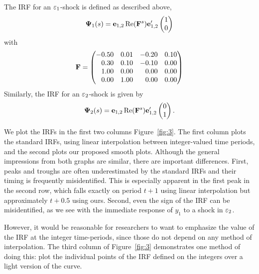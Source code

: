 \documentclass[AER,reviewmode]{tex/AEA}
\begin{document}
The IRF for an $\varepsilon_1$-shock is defined as described above,
\begin{equation*}
  \Psiv_1(s) = \emat_{1,2} \Re(\Fm^s) \emat_{1,2}'
  \begin{pmatrix*}[l]
    1 \\ 0
  \end{pmatrix*}
\end{equation*}
with
\begin{equation*}
\Fm = \begin{pmatrix*}[r]
    - 0.50 & 0.01 & -0.20 & 0.10 \\
      0.30 & 0.10 & -0.10 & 0.00 \\
      1.00 & 0.00 & 0.00 & 0.00 \\
      0.00 & 1.00 & 0.00 & 0.00
  \end{pmatrix*}
\end{equation*}
Similarly, the IRF for an $\varepsilon_2$-shock is given by
\begin{equation*}
  \Psiv_2(s) = \emat_{1,2} \Re(\Fm^s) \emat_{1,2}'
  \begin{pmatrix*}[l]
    0 \\ 1
  \end{pmatrix*}.
\end{equation*}

We plot the IRFs in the first two columns Figure~\ref{fig:3}. The
first column plots the standard IRFs, using linear interpolation
between integer-valued time periods, and the second plots our proposed
smooth plots. Although the general impressions from both graphs are
similar, there are important differences. First, peaks and troughs are
often underestimated by the standard IRFs and their timing is
frequently misidentified. This is especially apparent in the first
peak in the second row, which falls exactly on period $t+1$ using
linear interpolation but approximately $t+0.5$ using ours.  Second,
even the sign of the IRF can be misidentified, as we see with the
immediate response of $y_{1}$ to a shock in $\varepsilon_{2}$.

However, it would be reasonable for researchers to want to emphasize
the value of the IRF at the integer time-periods, since those do not
depend on any method of interpolation. The third column of
Figure~\ref{fig:3} demonstrates one method of doing this: plot the
individual points of the IRF defined on the integers over a light
version of the curve.
\end{document}
